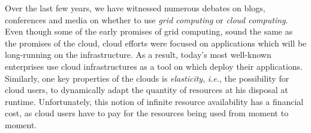 


Over the last few years, we have witnessed numerous debates on blogs, conferences and media on whether to use \emph{grid computing} or \emph{cloud computing}.  Even though some of the early promises of grid computing, sound the same as the promises of the cloud, cloud efforts were focused on applications which will be long-running on the infrastructure. As a result, today's most well-known enterprises use cloud infrastructures as a tool on which deploy their applications. Similarly, one key properties of the clouds is \emph{elasticity}, \emph{i.e.}, the possibility for cloud users, to dynamically adapt the quantity of resources at his disposal at runtime.  Unfortunately, this notion of infinite resource availability has a financial cost, as cloud users have to pay for the resources being used from moment to moment.


